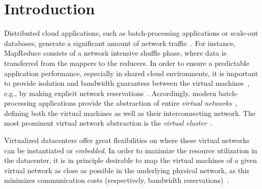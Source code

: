 \documentclass[preprint,12pt]{elsarticle}
\begin{document}
%

\section{Introduction}


Distributed cloud applications, such as batch-processing applications or scale-out databases, generate a significant amount of network traffic~\cite{talk-about}.
For instance, MapReduce consists of a network intensive shuffle phase,
where data is transferred from the mappers to the reducers.
In order to ensure a predictable application performance, especially in shared cloud environments,
it is important to provide isolation and bandwidth guarantees between the virtual machines~\cite{amazonbw},
e.g., by making explicit network reservations~\cite{oktopus}.
Accordingly, modern batch-processing applications provide the abstraction of entire \emph{virtual networks}~\cite{talk-about},
defining both the virtual machines
as well as their interconnecting network. The most prominent virtual network abstraction is the \emph{virtual cluster}~\cite{oktopus,proteus}.

Virtualized datacenters
offer great flexibilities on where these virtual networks
can be instantiated or \emph{embedded}.
In order to maximize the resource utilization in the datacenter, it is in principle desirable to
map the virtual machines of a given virtual network as close as possible
in the underlying physical network, as this minimizes communication costs (respectively, bandwidth reservations)~\cite{oktopus,proteus}.
\end{document}
